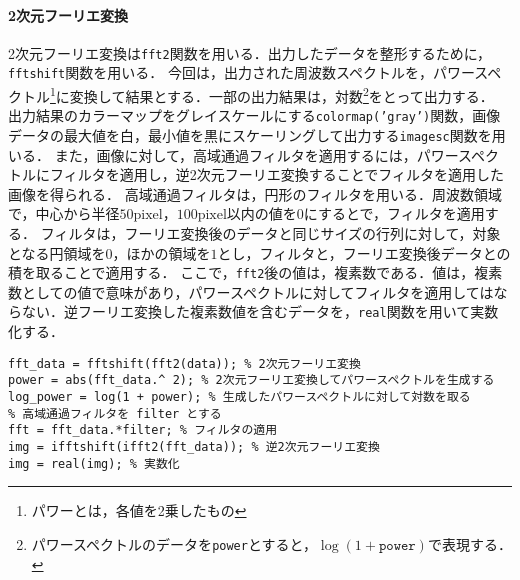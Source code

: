 \paragraph{2次元フーリエ変換}
2次元フーリエ変換は\texttt{fft2}関数を用いる．出力したデータを整形するために，\texttt{fftshift}関数を用いる．
今回は，出力された周波数スペクトルを，パワースペクトル\footnote{パワーとは，各値を2乗したもの}に変換して結果とする．一部の出力結果は，対数\footnote{パワースペクトルのデータを\texttt{power}とすると，\(\log(1+\texttt{power})\)で表現する．}をとって出力する．
出力結果のカラーマップをグレイスケールにする\texttt{colormap('gray')}関数，画像データの最大値を白，最小値を黒にスケーリングして出力する\texttt{imagesc}関数を用いる．
また，画像に対して，高域通過フィルタを適用するには，パワースペクトルにフィルタを適用し，逆2次元フーリエ変換することでフィルタを適用した画像を得られる．
高域通過フィルタは，円形のフィルタを用いる．周波数領域で，中心から半径\(50\textrm{pixel}\)，\(100\textrm{pixel}\)以内の値を\(0\)にするとで，フィルタを適用する．
フィルタは，フーリエ変換後のデータと同じサイズの行列に対して，対象となる円領域を\(0\)，ほかの領域を\(1\)とし，フィルタと，フーリエ変換後データとの積を取ることで適用する．
ここで，\texttt{fft2}後の値は，複素数である．値は，複素数としての値で意味があり，パワースペクトルに対してフィルタを適用してはならない．逆フーリエ変換した複素数値を含むデータを，\texttt{real}関数を用いて実数化する．
\begin{lstlisting}[caption={2次元フーリエ変換},label={src:2次元フーリエ変換}]
% 画像データを data とする
fft_data = fftshift(fft2(data)); % 2次元フーリエ変換
power = abs(fft_data.^ 2); % 2次元フーリエ変換してパワースペクトルを生成する
log_power = log(1 + power); % 生成したパワースペクトルに対して対数を取る
% 高域通過フィルタを filter とする
fft = fft_data.*filter; % フィルタの適用
img = ifftshift(ifft2(fft_data)); % 逆2次元フーリエ変換
img = real(img); % 実数化
	\end{lstlisting}
